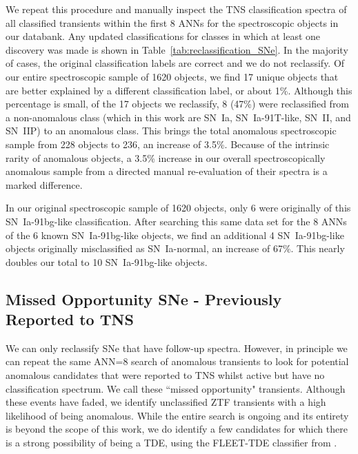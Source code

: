 \documentclass[twocolumn]{aastex63}
\begin{document}
We repeat this procedure and manually inspect the TNS classification spectra of all classified transients within the first 8 ANNs for the spectroscopic objects in our databank. Any updated classifications for classes in which at least one discovery was made is shown in Table~\ref{tab:reclassification_SNe}. In the majority of cases, the original classification labels are correct and we do not reclassify. Of our entire spectroscopic sample of 1620 objects, we find 17 unique objects that are better explained by a different classification label, or about 1\%. Although this percentage is small, of the 17 objects we reclassify, 8 (47\%) were reclassified from a non-anomalous class (which in this work are SN~Ia, SN~Ia-91T-like, SN~II, and SN~IIP) to an anomalous class. This brings the total anomalous spectroscopic sample from 228 objects to 236, an increase of 3.5\%. Because of the intrinsic rarity of anomalous objects, a 3.5\% increase in our overall spectroscopically anomalous sample from a directed manual re-evaluation of their spectra is a marked difference. \par

In our original spectroscopic sample of 1620 objects, only 6 were originally of this SN~Ia-91bg-like classification. After searching this same data set for the 8 ANNs of the 6 known SN~Ia-91bg-like objects, we find an additional 4 SN~Ia-91bg-like objects originally misclassified as SN~Ia-normal, an increase of 67\%. This nearly doubles our total to 10 SN~Ia-91bg-like objects. \par

\subsection{Missed Opportunity SNe - Previously Reported to TNS}  \label{subsec:previously_reported}

We can only reclassify SNe that have follow-up spectra. However, in principle we can repeat the same ANN=8 search of anomalous transients to look for potential anomalous candidates that were reported to TNS whilst active but have no classification spectrum. We call these ``missed opportunity" transients. Although these events have faded, we identify unclassified ZTF transients with a high likelihood of being anomalous. While the entire search is ongoing and its entirety is beyond the scope of this work, we do identify a few candidates for which there is a strong possibility of being a TDE, using the FLEET-TDE classifier from \cite{Gomez2023TDE}. \par
\end{document}
